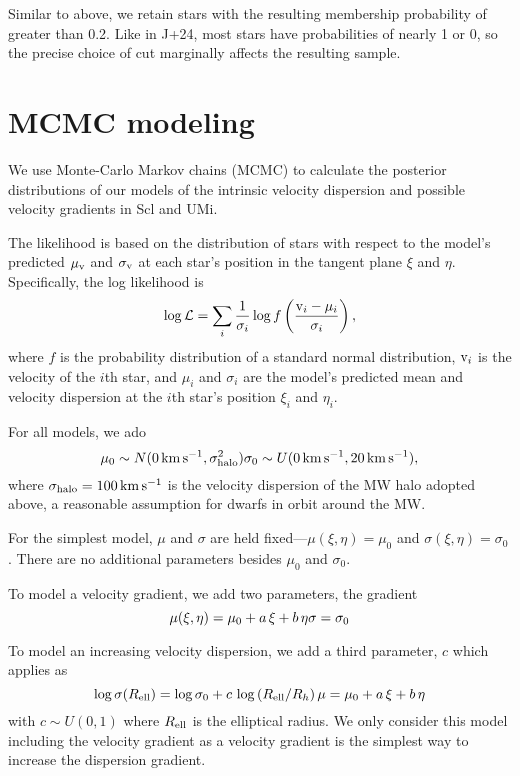 Similar to above, we retain stars with the resulting membership
probability of greater than 0.2. Like in J+24, most stars have
probabilities of nearly 1 or 0, so the precise choice of cut marginally
affects the resulting sample.

\section{MCMC modeling}\label{mcmc-modeling}

We use Monte-Carlo Markov chains (MCMC) to calculate the posterior
distributions of our models of the intrinsic velocity dispersion and
possible velocity gradients in Scl and UMi.

The likelihood is based on the distribution of stars with respect to the
model's predicted \(\mu_{\rm v}\) and \(\sigma_{\rm v}\) at each star's position
in the tangent plane \(\xi\) and \(\eta\). Specifically, the log
likelihood is \begin{equation}{
\log {\cal L} = \sum_i \frac{1}{\sigma_i} \log f\left(\frac{{\rm v}_i - \mu_i}{\sigma_i}\right),
}\end{equation} where \(f\) is the probability distribution of a
standard normal distribution, \({\rm v}_i\) is the velocity of the \(i\)th
star, and \(\mu_i\) and \(\sigma_i\) are the model's predicted mean and
velocity dispersion at the \(i\)th star's position \(\xi_i\) and
\(\eta_i\).

For all models, we ado \begin{equation}{
\mu_{0} \sim N(0\,{\rm km\,s^{-1}}, \sigma^2_{\rm halo})\\
\sigma_{0} \sim U(0\,{\rm km\,s^{-1}}, 20\,{\rm km\,s^{-1}}),
}\end{equation} where \(\sigma_{\rm halo} = 100\,{\rm km\,s^{-1}}\) is
the velocity dispersion of the MW halo adopted above, a reasonable
assumption for dwarfs in orbit around the MW.

For the simplest model, \(\mu\) and \(\sigma\) are held
fixed---\(\mu(\xi, \eta) = \mu_0\) and \(\sigma(\xi, \eta) = \sigma_0\).
There are no additional parameters besides \(\mu_0\) and \(\sigma_0\).

To model a velocity gradient, we add two parameters, the gradient
\begin{equation}{
\mu(\xi, \eta) = \mu_0 + a\,\xi + b\,\eta\\
\sigma = \sigma_0
}\end{equation}

To model an increasing velocity dispersion, we add a third parameter,
\(c\) which applies as \begin{equation}{
\log \sigma(R_{\rm ell}) = \log \sigma_0 + c\,\log\left(R_{\rm ell} / R_h\right) \\
\mu = \mu_0 + a\,\xi + b\,\eta\\
}\end{equation} with \(c \sim U(0, 1)\) where \(R_{\rm ell}\) is the
elliptical radius. We only consider this model including the velocity
gradient as a velocity gradient is the simplest way to increase the
dispersion gradient.

